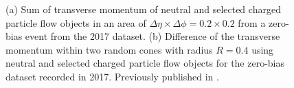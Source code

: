 
\begin{figure}[t]
    \caption[Sum of transverse momenta of particle flow objects and difference of the transverse momentum within two random cones.]{(a) Sum of transverse momentum of neutral and selected charged particle flow objects in an area of $\Delta \eta \times \Delta \phi = 0.2 \times 0.2$ from a zero-bias event from the 2017 dataset. (b) Difference of the transverse momentum within two random cones with radius $R = 0.4$ using neutral and selected charged particle flow objects for the zero-bias dataset recorded in 2017.
        Previously published in .}
    \label{fig:random-cones-balance}
\end{figure}

